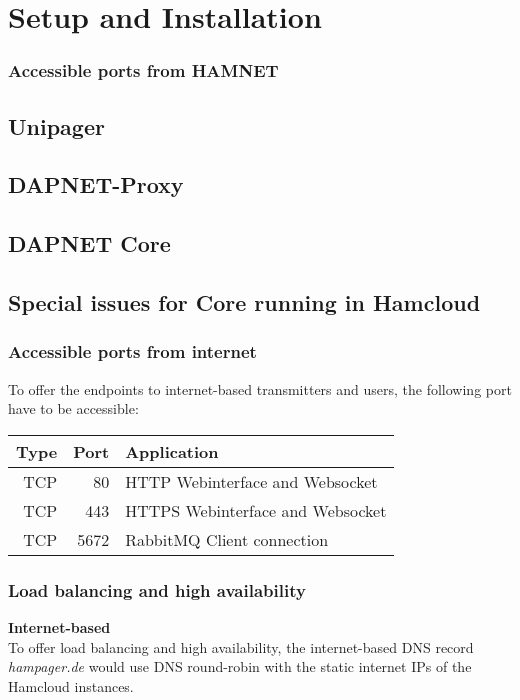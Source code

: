 \chapter{Setup and Installation}


\subsection{Accessible ports from HAMNET}

\section{Unipager}

\section{DAPNET-Proxy}

\section{DAPNET Core}

\section{Special issues for Core running in Hamcloud}

\subsection{Accessible ports from internet}
To offer the endpoints to internet-based transmitters and users, the following port have to be accessible:

\begin{tabular}{r|r|l}
Type & Port & Application\\
\hline
TCP & 80 & HTTP Webinterface and Websocket\\
TCP & 443 & HTTPS Webinterface  and Websocket\\
TCP & 5672 & RabbitMQ Client connection\\
\end{tabular}

\subsection{Load balancing and high availability}
\textbf{Internet-based}\\
To offer load balancing and high availability, the internet-based DNS record \textit{hampager.de} would use DNS round-robin with the static internet IPs of the Hamcloud instances.

